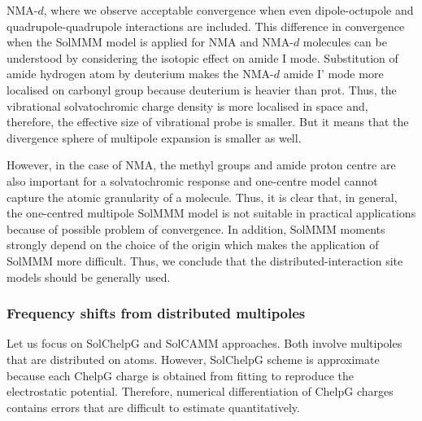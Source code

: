 \documentclass[a4paper,titlepage,twoside,fleqn,12pt]{book}
\begin{document}
\begin{refsection}
NMA-$d$, where we observe acceptable convergence when
even dipole\hyp{}octupole and quadrupole\hyp{}quadrupole
interactions are included.
This difference in convergence
when the SolMMM model is applied for NMA and
NMA-$d$ molecules can be understood by considering the isotopic
effect on amide I mode. Substitution of amide hydrogen
atom by deuterium makes the NMA-$d$ amide I' mode more localised
on carbonyl group because deuterium is heavier than prot. 
Thus, the vibrational solvatochromic charge
density is more localised in space and, therefore, the effective
size of vibrational probe is smaller. 
But it means that the divergence sphere
of multipole expansion is smaller as well. 

However, in the case of NMA,
the methyl groups and amide proton centre are also important for a solvatochromic
response and one\hyp{}centre model cannot capture the atomic
granularity of a molecule. Thus, it is clear that, in general,
the one\hyp{}centred multipole SolMMM model is not suitable in
practical applications because of possible problem of convergence.
In addition, SolMMM moments strongly depend on the choice of the
origin \citep{Lee.Choi.Cho.JCP.2012} which makes the application
of SolMMM more difficult.
Thus, we conclude that the distributed\hyp{}interaction site
models should be generally used.

\subsubsection{Frequency shifts from distributed multipoles}

Let us focus on SolChelpG and SolCAMM approaches. Both involve multipoles
that are distributed on atoms. However, SolChelpG scheme is approximate
because each ChelpG charge is obtained from fitting to reproduce the electrostatic
potential. Therefore, numerical differentiation of ChelpG charges
contains errors that are difficult to estimate quantitatively.


\end{refsection}
\end{document}
